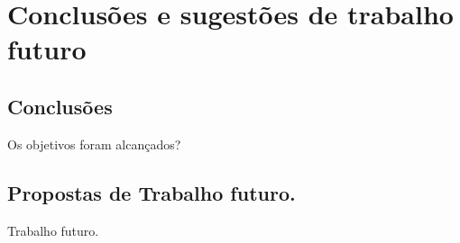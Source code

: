 \chapter{Conclusões e sugestões de trabalho futuro\label{cap6}}

\section{Conclusões}
 Os objetivos foram alcançados?
 
 
\section{Propostas de Trabalho futuro.}

Trabalho futuro.